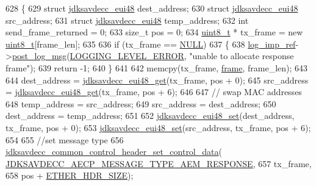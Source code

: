 \begin{DoxyCode}
628 \{
629     \textcolor{keyword}{struct }\hyperlink{structjdksavdecc__eui48}{jdksavdecc\_eui48} dest\_address;
630     \textcolor{keyword}{struct }\hyperlink{structjdksavdecc__eui48}{jdksavdecc\_eui48} src\_address;
631     \textcolor{keyword}{struct }\hyperlink{structjdksavdecc__eui48}{jdksavdecc\_eui48} temp\_address;
632     \textcolor{keywordtype}{int} send\_frame\_returned = 0;
633     \textcolor{keywordtype}{size\_t} pos = 0;
634     \hyperlink{stdint_8h_aba7bc1797add20fe3efdf37ced1182c5}{uint8\_t} * tx\_frame = \textcolor{keyword}{new} \hyperlink{stdint_8h_aba7bc1797add20fe3efdf37ced1182c5}{uint8\_t}[frame\_len];
635 
636     \textcolor{keywordflow}{if} (tx\_frame == \hyperlink{openavb__types__base__pub_8h_a070d2ce7b6bb7e5c05602aa8c308d0c4}{NULL})
637     \{
638         \hyperlink{namespaceavdecc__lib_acbe3e2a96ae6524943ca532c87a28529}{log\_imp\_ref}->\hyperlink{classavdecc__lib_1_1log_a68139a6297697e4ccebf36ccfd02e44a}{post\_log\_msg}(\hyperlink{namespaceavdecc__lib_a501055c431e6872ef46f252ad13f85cdaf2c4481208273451a6f5c7bb9770ec8a}{LOGGING\_LEVEL\_ERROR}, \textcolor{stringliteral}{"unable to
       allocate response frame"});
639         \textcolor{keywordflow}{return} -1;
640     \}
641 
642     memcpy(tx\_frame, \hyperlink{gst__avb__playbin_8c_ac8e710e0b5e994c0545d75d69868c6f0}{frame}, frame\_len);
643 
644     dest\_address = \hyperlink{group__eui48_ga7b4c95f03a90bdf416e9d0833ac08a86}{jdksavdecc\_eui48\_get}(tx\_frame, pos + 0);
645     src\_address = \hyperlink{group__eui48_ga7b4c95f03a90bdf416e9d0833ac08a86}{jdksavdecc\_eui48\_get}(tx\_frame, pos + 6);
646 
647     \textcolor{comment}{// swap MAC addresses}
648     temp\_address = src\_address;
649     src\_address = dest\_address;
650     dest\_address = temp\_address;
651 
652     \hyperlink{group__eui48_ga469d246a17ff1ee085030ee7dae57c5e}{jdksavdecc\_eui48\_set}(dest\_address, tx\_frame, pos + 0);
653     \hyperlink{group__eui48_ga469d246a17ff1ee085030ee7dae57c5e}{jdksavdecc\_eui48\_set}(src\_address, tx\_frame, pos + 6);
654 
655     \textcolor{comment}{//set message type}
656     \hyperlink{group__jdksavdecc__avtp__common__control__header_gaaa8fc67df8a6ca2ae198b00d444c2d02}{jdksavdecc\_common\_control\_header\_set\_control\_data}(
      \hyperlink{group__aecp__message__type_ga9cad401e0f60634a8f084d93b0374d31}{JDKSAVDECC\_AECP\_MESSAGE\_TYPE\_AEM\_RESPONSE},
657                                                       tx\_frame,
658                                                       pos + \hyperlink{namespaceavdecc__lib_a6c827b1a0d973e18119c5e3da518e65ca9512ad9b34302ba7048d88197e0a2dc0}{ETHER\_HDR\_SIZE});

\end{DoxyCode}
